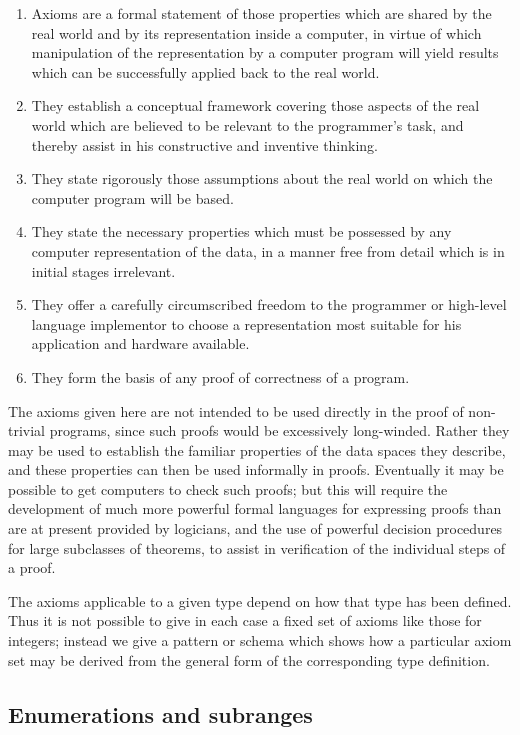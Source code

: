 \begin{enumerate}[leftmargin=2\parindent, label=(\arabic*)]
	\item Axioms are a formal statement of those properties which are shared by the real world and by its representation inside a computer, in virtue of which manipulation of the representation by a computer program will yield results which can be successfully applied back to the real world.
	\item They establish a conceptual framework covering those aspects of the real world which are believed to be relevant to the programmer's task, and thereby assist in his constructive and inventive thinking.
	\item They state rigorously those assumptions about the real world on which the computer program will be based.
	\item They state the necessary properties which must be possessed by any computer representation of the data, in a manner free from detail which is in initial stages irrelevant.
	\item They offer a carefully circumscribed freedom to the programmer or high-level language implementor to choose a representation most suitable for his application and hardware available.
	\item They form the basis of any proof of correctness of a program.
\end{enumerate}

The axioms given here are not intended to be used directly in the proof of non-trivial programs, since such proofs would be excessively long-winded. Rather they may be used to establish the familiar properties of the data spaces they describe, and these properties can then be used informally in proofs. Eventually it may be possible to get computers to check such proofs; but this will require the development of much more powerful formal languages for expressing proofs than are at present provided by logicians, and the use of powerful decision procedures for large subclasses of theorems, to assist in verification of the individual steps of a proof.

The axioms applicable to a given type depend on how that type has been defined. Thus it is not possible to give in each case a fixed set of axioms like those for integers; instead we give a pattern or schema which shows how a particular axiom set may be derived from the general form of the corresponding type definition.

\subsection{Enumerations and subranges}

